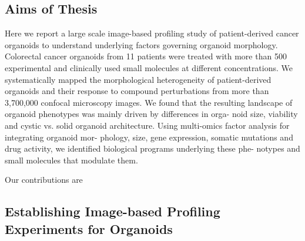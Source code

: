 \begin{flushleft}
\section{Aims of Thesis}
Here we report a large scale image-based profiling study of patient-derived cancer organoids to understand underlying factors governing organoid morphology. Colorectal cancer organoids from 11 patients were treated with more than 500 experimental and clinically used small molecules at different concentrations. We systematically mapped the morphological heterogeneity of patient-derived organoids and their response to compound perturbations from more than 3,700,000 confocal microscopy images. We found that the resulting landscape of organoid phenotypes was mainly driven by differences in orga- noid size, viability and cystic vs. solid organoid architecture. Using multi-omics factor analysis for integrating organoid mor- phology, size, gene expression, somatic mutations and drug activity, we identified biological programs underlying these phe- notypes and small molecules that modulate them.

Our contributions are

\subsection{Establishing Image-based Profiling Experiments for Organoids}



\end{flushleft}
